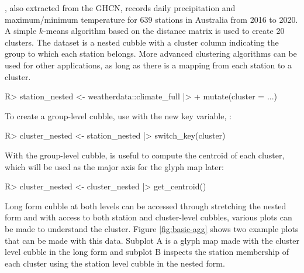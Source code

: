 \documentclass[
]{jss}
\begin{document}
, also extracted from the GHCN, records daily precipitation and maximum/minimum temperature for 639 stations in Australia from 2016 to 2020. A simple \(k\)-means algorithm based on the distance matrix is used to create 20 clusters. The dataset  is a nested cubble with a cluster column indicating the group to which each station belongs. More advanced clustering algorithms can be used for other applications, as long as there is a mapping from each station to a cluster.

\begin{CodeChunk}
\begin{CodeInput}
R> station_nested <- weatherdata::climate_full |>
+   mutate(cluster = ...)
\end{CodeInput}
\end{CodeChunk}

To create a group-level cubble, use  with the new key variable, :

\begin{CodeChunk}
\begin{CodeInput}
R> cluster_nested <- station_nested |> switch_key(cluster)
\end{CodeInput}
\end{CodeChunk}

With the group-level cubble,  is useful to compute the centroid of each cluster, which will be used as the major axis for the glyph map later:

\begin{CodeChunk}
\begin{CodeInput}
R> cluster_nested <- cluster_nested |> get_centroid()
\end{CodeInput}
\end{CodeChunk}

Long form cubble at both levels can be accessed through stretching the nested form and with access to both station and cluster-level cubbles, various plots can be made to understand the cluster. Figure \ref{fig:basic-agg} shows two example plots that can be made with this data. Subplot A is a glyph map made with the cluster level cubble in the long form and subplot B inspects the station membership of each cluster using the station level cubble in the nested form.
\end{document}
